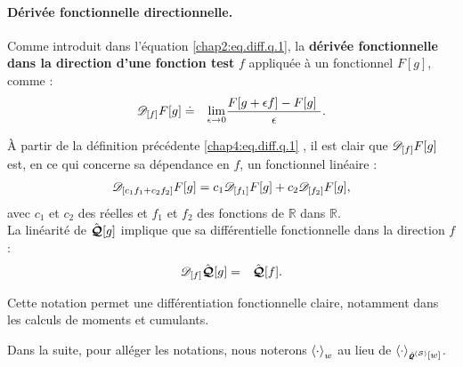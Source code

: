 \begin{mdframed}[
	linewidth=0.5pt, 
	backgroundcolor=gray!5, 
	roundcorner=50pt,	
	innerleftmargin=5pt,
    innerrightmargin=5pt,
    innertopmargin=-10pt,
    innerbottommargin=2pt,
    leftmargin=2pt,
    rightmargin=2pt
	]
\paragraph{Dérivée fonctionnelle directionnelle.}
Comme introduit dans l'équation \eqref{chap2:eq.diff.q.1},  la {\bf dérivée fonctionnelle dans la direction d’une fonction test} $f$ appliquée à un fonctionnel $F[g]$, comme :
\begin{eqnarray}\label{chap4:eq.diff.q.1}
	\dfonc{f} F[g] & \doteq &  \underset{\epsilon \to 0 }{ \lim  } \frac{ F[g + \epsilon f ]  - F [ g] }{\epsilon} .	
\end{eqnarray}
\end{mdframed}

À partir de la définition précédente \eqref{chap4:eq.diff.q.1} , il est clair que $\mathscr{D}_{[f]} F[g]$ est, en ce qui concerne sa dépendance en $f$, un fonctionnel linéaire :
\begin{eqnarray}\label{chap4:eq.diff.lin.q.1}
	\mathscr{D}_{[c_1f_1 + c_2 f_2]}F[g] = c_1 \mathscr{D}_{[f_1]}F[g] + c_2 \mathscr{D}_{[f_2]}F[g],
\end{eqnarray}
avec $c_1$ et $c_2$ des réelles et $f_1$ et $f_2$ des fonctions de $\mathbb{R}$ dans $\mathbb{R}$.\\

La linéarité de $\hat{\bm{\mathcal{Q}}}[g]$ implique que sa différentielle fonctionnelle dans la direction $f$ :
\begin{eqnarray}
	\mathscr{D}_{[f]} \hat{\bm{\mathcal{Q}}}[g] & =  & \hat{\bm{\mathcal{Q}}}[f] .	
\end{eqnarray}

\medskip

Cette notation permet une différentiation fonctionnelle claire, notamment dans les calculs de moments et cumulants.

\medskip

Dans la suite, pour alléger les notations, nous noterons $\braket{\cdot}_{w}$ au lieu de $\braket{\cdot}_{\hat{\bm{\varrho}}^{(\mathcal{S})}[w]}$.

